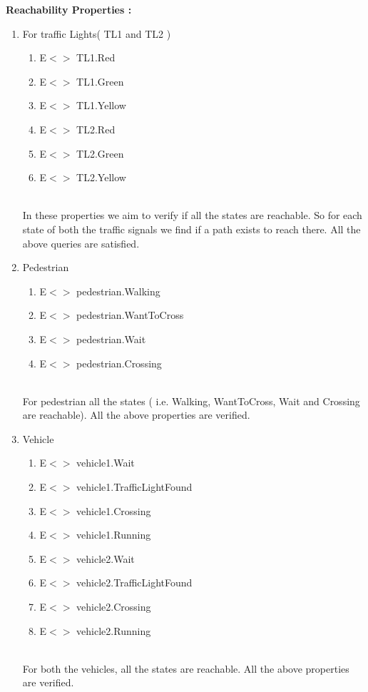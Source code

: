 \documentclass[conference]{IEEEtran}
\begin{document}
\noindent \textbf{Reachability Properties :}
\begin{enumerate}

    \item For traffic Lights( TL1 and TL2 )
    \begin{enumerate}
        \item E$<>$ TL1.Red
        \item E$<>$ TL1.Green
        \item E$<>$ TL1.Yellow
        \item E$<>$ TL2.Red
        \item E$<>$ TL2.Green
        \item E$<>$ TL2.Yellow
    \end{enumerate}
    \\
    
    In these properties we aim to verify if all the states are reachable. So for each state of both the traffic signals we find if a path exists to reach there. All the above queries are satisfied.
    \\
    \item Pedestrian
    \begin{enumerate}
        \item E$<>$ pedestrian.Walking
        \item E$<>$ pedestrian.WantToCross
        \item E$<>$ pedestrian.Wait
        \item E$<>$ pedestrian.Crossing
    \end{enumerate}
    \\
    
    For pedestrian all the states ( i.e. Walking, WantToCross, Wait and Crossing are reachable). All the above properties are verified.
    \\
    
    \item Vehicle
    \begin{enumerate}
        \item E$<>$ vehicle1.Wait
        \item E$<>$ vehicle1.TrafficLightFound
        \item E$<>$ vehicle1.Crossing
        \item E$<>$ vehicle1.Running
        \item E$<>$ vehicle2.Wait
        \item E$<>$ vehicle2.TrafficLightFound
        \item E$<>$ vehicle2.Crossing
        \item E$<>$ vehicle2.Running
    \end{enumerate}
    \\
    For both the vehicles, all the states are reachable. All the above properties are verified.
    \\
    

\end{enumerate}
\end{document}
